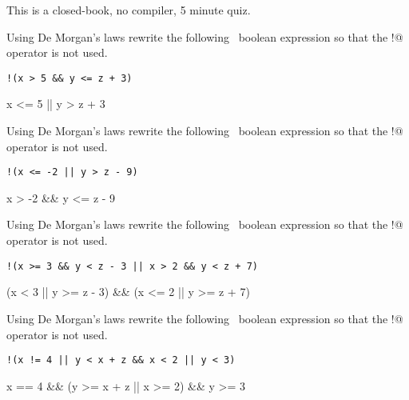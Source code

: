 

This is a closed-book, no compiler, 5 minute quiz.

\nextq
Using De Morgan's laws rewrite the following \cpp\ boolean expression so that
the \verb@!@ operator is not used.
\begin{center}
\verb~!(x > 5 && y <= z + 3)~
\end{center}
\ANSWER
\begin{answercode}
x <= 5 || y > z + 3
\end{answercode}

\nextq
Using De Morgan's laws rewrite the following \cpp\ boolean expression so that
the \verb@!@ operator is not used.
\begin{center}
\verb~!(x <= -2 || y > z - 9)~
\end{center}
\ANSWER
\begin{answercode}
x > -2 && y <= z - 9
\end{answercode}

\nextq
Using De Morgan's laws rewrite the following \cpp\ boolean expression so that the
\verb@!@ operator is not used.
\begin{center}
\verb~!(x >= 3 && y < z - 3 || x > 2 && y < z + 7)~
\end{center}
\ANSWER
\begin{answercode}
(x < 3 || y >= z - 3) && (x <= 2 || y >= z + 7)
\end{answercode}

\nextq
Using De Morgan's laws rewrite the following \cpp\ boolean expression so that the
\verb@!@ operator is not used.
\begin{center}
\verb~!(x != 4 || y < x + z && x < 2 || y < 3)~
\end{center}
\ANSWER
\begin{answercode}
x == 4 && (y >= x + z || x >= 2) && y >= 3
\end{answercode}


